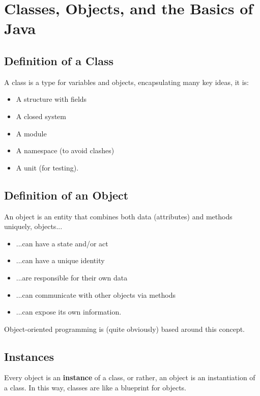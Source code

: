\documentclass[a4paper, 12pt, twoside]{article}
\begin{document}
\newpage

\section{Classes, Objects, and the Basics of Java}

\subsection{Definition of a Class}

A class is a type for variables and objects, encapsulating many key
ideas, it is:
\begin{itemize}
    \item A structure with fields
    \item A closed system
    \item A module
    \item A namespace (to avoid clashes)
    \item A unit (for testing).
\end{itemize}

\subsection{Definition of an Object}

An object is an entity that combines both data (attributes) and
methods uniquely, objects...
\begin{itemize}
    \item ...can have a state and/or act
    \item ...can have a unique identity
    \item ...are responsible for their own data
    \item ...can communicate with other objects via methods
    \item ...can expose its own information.
\end{itemize}
Object-oriented programming is (quite obviously) based around this
concept.

\subsection{Instances}

Every object is an \textbf{instance} of a class, or rather, an object
is an instantiation of a class. In this way, classes are like a
blueprint for objects.
\end{document}

